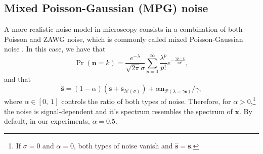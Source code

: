 \documentclass{article}
\begin{document}

\subsection{Mixed Poisson-Gaussian (MPG) noise}

A more realistic noise model in microscopy consists in a combination
of both Poisson and ZAWG noise, which is commonly called mixed
Poisson-Gaussian noise \cite{meiniel2018denoising}. In this
case, we have that
\begin{equation}
  \Pr({\mathbf n}{=}k) = \frac{e^{-\lambda}}{\sqrt{2\pi}\sigma}\sum_{p=0}^{\infty}\frac{\lambda^p}{p!} e^{-\frac{\gamma p - k}{2\sigma^2}},
  \label{eq:PN}
\end{equation}
and that
\begin{equation}
  \hat{\mathbf s} = (1-\alpha)(\mathbf{s} + {\mathbf s}_{\mathcal{N}(\sigma)}) + \alpha{\mathbf n}_{\mathcal{P}(\lambda=\gamma\mathbf{s})}/\gamma,
  \label{eq:MPG_noise_model} 
\end{equation}
where $\alpha\in[0,~1]$ controls the ratio of both types of
noise. Therefore, for $\alpha > 0$,\footnote{If $\sigma=0$ and
  $\alpha=0$, both types of noise vanish and
  $\hat{\mathbf{s}}=\mathbf{s}$.} the noise is signal-dependent and
it's spectrum resembles the spectrum of $\mathbf{x}$. By default, in
our experiments, $\alpha=0.5$.







\end{document}

